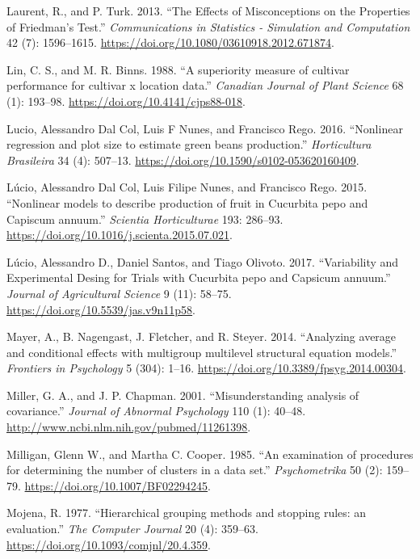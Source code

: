 \documentclass[
]{book}
\numberwithin{equation}{section}
\newlength{\cslhangindent}
\newenvironment{cslreferences}%
  {\setlength{\parindent}{0pt}%
  \everypar{\setlength{\hangindent}{\cslhangindent}}\ignorespaces}%
  {\par}
\begin{document}
\begin{cslreferences}
\leavevmode\hypertarget{ref-Laurent2013}{}%
Laurent, R., and P. Turk. 2013. ``The Effects of Misconceptions on the Properties of Friedman's Test.'' \emph{Communications in Statistics - Simulation and Computation} 42 (7): 1596--1615. \url{https://doi.org/10.1080/03610918.2012.671874}.

\leavevmode\hypertarget{ref-Lin1988}{}%
Lin, C. S., and M. R. Binns. 1988. ``A superiority measure of cultivar performance for cultivar x location data.'' \emph{Canadian Journal of Plant Science} 68 (1): 193--98. \url{https://doi.org/10.4141/cjps88-018}.

\leavevmode\hypertarget{ref-Lucio2016}{}%
Lucio, Alessandro Dal Col, Luis F Nunes, and Francisco Rego. 2016. ``Nonlinear regression and plot size to estimate green beans production.'' \emph{Horticultura Brasileira} 34 (4): 507--13. \url{https://doi.org/10.1590/s0102-053620160409}.

\leavevmode\hypertarget{ref-Lucio2015}{}%
Lúcio, Alessandro Dal Col, Luis Filipe Nunes, and Francisco Rego. 2015. ``Nonlinear models to describe production of fruit in Cucurbita pepo and Capiscum annuum.'' \emph{Scientia Horticulturae} 193: 286--93. \url{https://doi.org/10.1016/j.scienta.2015.07.021}.

\leavevmode\hypertarget{ref-Lucio2017}{}%
Lúcio, Alessandro D., Daniel Santos, and Tiago Olivoto. 2017. ``Variability and Experimental Desing for Trials with Cucurbita pepo and Capsicum annuum.'' \emph{Journal of Agricultural Science} 9 (11): 58--75. \url{https://doi.org/10.5539/jas.v9n11p58}.

\leavevmode\hypertarget{ref-Mayer2014}{}%
Mayer, A., B. Nagengast, J. Fletcher, and R. Steyer. 2014. ``Analyzing average and conditional effects with multigroup multilevel structural equation models.'' \emph{Frontiers in Psychology} 5 (304): 1--16. \url{https://doi.org/10.3389/fpsyg.2014.00304}.

\leavevmode\hypertarget{ref-Miller2001}{}%
Miller, G. A., and J. P. Chapman. 2001. ``Misunderstanding analysis of covariance.'' \emph{Journal of Abnormal Psychology} 110 (1): 40--48. \url{http://www.ncbi.nlm.nih.gov/pubmed/11261398}.

\leavevmode\hypertarget{ref-Milligan1985}{}%
Milligan, Glenn W., and Martha C. Cooper. 1985. ``An examination of procedures for determining the number of clusters in a data set.'' \emph{Psychometrika} 50 (2): 159--79. \url{https://doi.org/10.1007/BF02294245}.

\leavevmode\hypertarget{ref-Mojena1977}{}%
Mojena, R. 1977. ``Hierarchical grouping methods and stopping rules: an evaluation.'' \emph{The Computer Journal} 20 (4): 359--63. \url{https://doi.org/10.1093/comjnl/20.4.359}.


\end{cslreferences}
\end{document}
